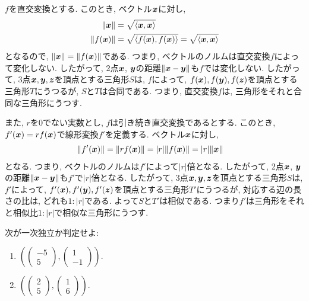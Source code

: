 \begin{remark}
  $f$を直交変換とする.
  このとき, ベクトル$\boldsymbol{x}$に対し,
  \begin{align*}
    \|\boldsymbol{x}\|&=\sqrt{\Braket{\boldsymbol{x},\boldsymbol{x}}}\\
    \|f(\boldsymbol{x})\|&=\sqrt{\Braket{f(\boldsymbol{x}),f(\boldsymbol{x})}}=\sqrt{\Braket{\boldsymbol{x},\boldsymbol{x}}}
  \end{align*}
  となるので, $\|\boldsymbol{x}\|=\|f(\boldsymbol{x})\|$である.
  つまり, ベクトルのノルムは直交変換$f$によって変化しない.
  したがって, 2点$\boldsymbol{x}$, $\boldsymbol{y}$の距離$\|\boldsymbol{x}-\boldsymbol{y}\|$も$f$では変化しない.
  したがって, 3点$\boldsymbol{x},\boldsymbol{y},\boldsymbol{z}$を頂点とする三角形$S$は,
  $f$によって, $f(\boldsymbol{x}),f(\boldsymbol{y}),f(\boldsymbol{z})$を頂点とする三角形$T$にうつるが,
  $S$と$T$は合同である.
  つまり, 直交変換$f$は, 三角形をそれと合同な三角形にうつす.

  また, $r$を$0$でない実数とし, $f$は引き続き直交変換であるとする.
  このとき, $f'(\boldsymbol{x})=rf(\boldsymbol{x})$で線形変換$f'$を定義する.
  ベクトル$\boldsymbol{x}$に対し,
  \begin{align*}
    \|f'(\boldsymbol{x})\|&=\|rf(\boldsymbol{x})\|=|r|\|f(\boldsymbol{x})\|=|r|\|\boldsymbol{x}\|
  \end{align*}
  となる.
  つまり, ベクトルのノルムは$f'$によって$|r|$倍となる.
  したがって, 2点$\boldsymbol{x}$, $\boldsymbol{y}$の距離$\|\boldsymbol{x}-\boldsymbol{y}\|$も$f'$で$|r|$倍となる.
  したがって, 3点$\boldsymbol{x},\boldsymbol{y},\boldsymbol{z}$を頂点とする三角形$S$は,
  $f'$によって, $f'(\boldsymbol{x}),f'(\boldsymbol{y}),f'(\boldsymbol{z})$を頂点とする三角形$T'$にうつるが,
  対応する辺の長さの比は, どれも$1:|r|$である.
  よって$S$と$T'$は相似である.
  つまり$f'$は三角形をそれと相似比$1:|r|$で相似な三角形にうつす.
\end{remark}

\begin{quiz}
  \label{quiz:5:1}
  次が一次独立か判定せよ:
  \begin{enumerate}
  \item $(\begin{pmatrix}-5\\5\end{pmatrix},\begin{pmatrix}1\\-1\end{pmatrix})$.
  \item $(\begin{pmatrix}2\\5\end{pmatrix},\begin{pmatrix}1\\6\end{pmatrix})$.
  \end{enumerate}
\end{quiz}

